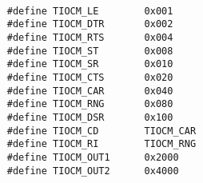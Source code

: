 \label{index-Cables-218}

\footnotesize
\begin{verbatim}
     
     #define TIOCM_LE        0x001
     #define TIOCM_DTR       0x002
     #define TIOCM_RTS       0x004
     #define TIOCM_ST        0x008
     #define TIOCM_SR        0x010
     #define TIOCM_CTS       0x020
     #define TIOCM_CAR       0x040
     #define TIOCM_RNG       0x080
     #define TIOCM_DSR       0x100
     #define TIOCM_CD        TIOCM_CAR
     #define TIOCM_RI        TIOCM_RNG
     #define TIOCM_OUT1      0x2000
     #define TIOCM_OUT2      0x4000
\end{verbatim}
\normalsize
